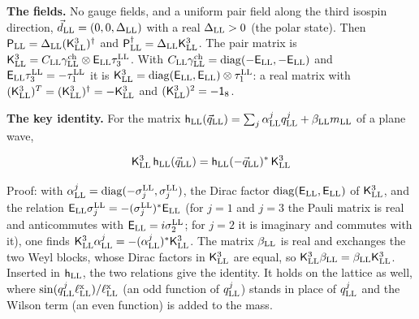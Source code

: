 \documentclass[
  10pt,
]{article}
\begin{document}
\textbf{The fields.} No gauge fields, and a uniform pair field along the
third isospin direction, \(\vec d_{\rm LL}=(0,0,\Delta_{\rm LL})\) with
a real \(\Delta_{\rm LL}>0\) (the polar state). Then
\(\mathsf P_{\rm LL}=\Delta_{\rm LL}(\mathsf K^3_{\rm LL})^\dagger\) and
\(\mathsf P_{\rm LL}^\dagger=\Delta_{\rm LL}\mathsf K^3_{\rm LL}\). The
pair matrix is
\(\mathsf K^3_{\rm LL}=C_{\rm LL}\gamma^{\rm ch}_{\rm LL}\otimes\mathsf E_{\rm LL}\tau^{\rm LL}_3\).
With
\(C_{\rm LL}\gamma^{\rm ch}_{\rm LL}=\mathrm{diag}(-\mathsf E_{\rm LL},-\mathsf E_{\rm LL})\)
and \(\mathsf E_{\rm LL}\tau^{\rm LL}_3=-\tau^{\rm LL}_1\) it is
\(\mathsf K^3_{\rm LL}=\mathrm{diag}(\mathsf E_{\rm LL},\mathsf E_{\rm LL})\otimes\tau^{\rm LL}_1\):
a real matrix with
\((\mathsf K^3_{\rm LL})^T=(\mathsf K^3_{\rm LL})^\dagger=-\mathsf K^3_{\rm LL}\)
and \((\mathsf K^3_{\rm LL})^2=-\mathsf 1_8\).

\textbf{The key identity.} For the matrix
\(\mathsf h_{\rm LL}(\vec q_{\rm LL})=\sum_j\alpha^j_{\rm LL}q^j_{\rm LL}+\beta_{\rm LL}m_{\rm LL}\)
of a plane wave,

\[\mathsf K^3_{\rm LL}\,\mathsf h_{\rm LL}(\vec q_{\rm LL})=\mathsf h_{\rm LL}(-\vec q_{\rm LL})^{*}\,\mathsf K^3_{\rm LL}\]

Proof: with
\(\alpha^j_{\rm LL}=\mathrm{diag}(-\sigma^{\rm LL}_j,\sigma^{\rm LL}_j)\),
the Dirac factor
\(\mathrm{diag}(\mathsf E_{\rm LL},\mathsf E_{\rm LL})\) of
\(\mathsf K^3_{\rm LL}\), and the relation
\(\mathsf E_{\rm LL}\sigma^{\rm LL}_j=-(\sigma^{\rm LL}_j)^{*}\mathsf E_{\rm LL}\)
(for \(j=1\) and \(j=3\) the Pauli matrix is real and anticommutes with
\(\mathsf E_{\rm LL}=i\sigma^{\rm LL}_2\); for \(j=2\) it is imaginary
and commutes with it), one finds
\(\mathsf K^3_{\rm LL}\alpha^j_{\rm LL}=-(\alpha^j_{\rm LL})^{*}\mathsf K^3_{\rm LL}\).
The matrix \(\beta_{\rm LL}\) is real and exchanges the two Weyl blocks,
whose Dirac factors in \(\mathsf K^3_{\rm LL}\) are equal, so
\(\mathsf K^3_{\rm LL}\beta_{\rm LL}=\beta_{\rm LL}\mathsf K^3_{\rm LL}\).
Inserted in \(\mathsf h_{\rm LL}\), the two relations give the identity.
It holds on the lattice as well, where
\(\sin(q^j_{\rm LL}\ell^{\rm x}_{\rm LL})/\ell^{\rm x}_{\rm LL}\) (an
odd function of \(q^j_{\rm LL}\)) stands in place of \(q^j_{\rm LL}\)
and the Wilson term (an even function) is added to the mass.
\end{document}
